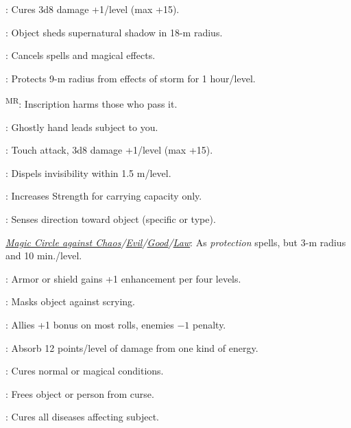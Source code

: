 
: Cures 3d8 damage +1/level (max +15).


: Object sheds supernatural shadow in 18-m radius.

: Cancels spells and magical effects.

: Protects 9-m radius from effects of storm for 1 hour/level. %

\textsuperscript{MR}: Inscription harms those who pass it.

: Ghostly hand leads subject to you.

: Touch attack, 3d8 damage +1/level (max +15).

: Dispels invisibility within 1.5 m/level.

: Increases Strength for carrying capacity only. %

: Senses direction toward object (specific or type).

\noindent\textit{\hyperref[spell:Magic Circle against Chaos]{Magic Circle against Chaos}/\hyperref[spell:Magic Circle against Evil]{Evil}/\hyperref[spell:Magic Circle against Good]{Good}/\hyperref[spell:Magic Circle against Law]{Law}}: As \emph{protection} spells, but 3-m radius and 10 min./level.

: Armor or shield gains +1 enhancement per four levels.


: Masks object against scrying.

: Allies +1 bonus on most rolls, enemies $-1$ penalty.

: Absorb 12 points/level of damage from one kind of energy.

: Cures normal or magical conditions.

: Frees object or person from curse.

: Cures all diseases affecting subject.

